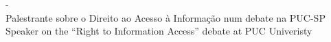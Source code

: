 \documentclass[]{friggeri-cv}
\begin{document}
{\footnotesize{}} - \href{http://artigo19.org/infoedireitoseu/?p=560}{\textbf{}}\\
%
{Palestrante sobre o Direito ao Acesso à Informação num debate na PUC-SP}%
{Speaker on the ``Right to Information Access'' debate at PUC Univeristy}
%
%
%
%
% 
\end{document}
